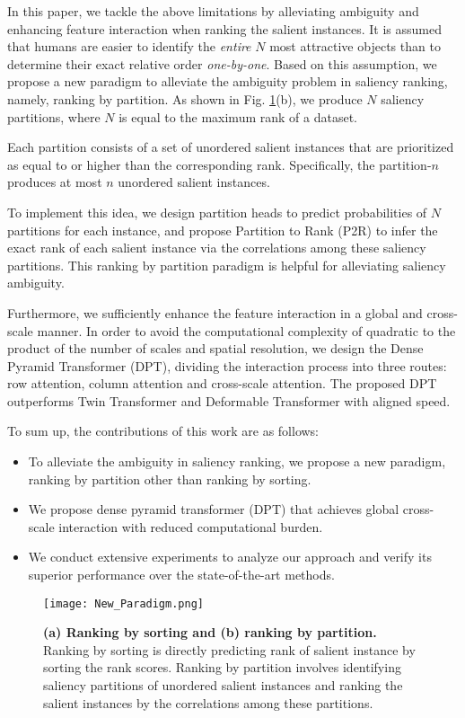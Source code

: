 \documentclass[sigconf]{acmart}
\begin{document}
In this paper, we tackle the above limitations by alleviating ambiguity and enhancing feature interaction when ranking the salient instances. It is assumed that humans are easier to identify the \textit{entire} $N$ most attractive objects than to determine their exact relative order \textit{one-by-one}. Based on this assumption, we propose a new paradigm to alleviate the ambiguity problem in saliency ranking, namely, ranking by partition. As shown in Fig. \ref{fig:Paradigm}(b), we produce $N$ saliency partitions, where $N$ is equal to the maximum rank of a dataset.

Each partition consists of a set of unordered salient instances that are prioritized as equal to or higher than the corresponding rank. Specifically, the partition-$n$ produces at most $n$ unordered salient instances.
 
To implement this idea, we design partition heads to predict probabilities of $N$ partitions for each instance, and propose Partition to Rank (P2R) to infer the exact rank of each salient instance via the correlations among these saliency partitions. This ranking by partition paradigm is helpful for alleviating saliency ambiguity.

Furthermore, we sufficiently enhance the feature interaction in a global and cross-scale manner. In order to avoid the computational complexity of quadratic to the product of the number of scales and spatial resolution, we design the Dense Pyramid Transformer (DPT), dividing the interaction process into three routes: row attention, column attention and cross-scale attention. 
The proposed DPT outperforms Twin Transformer \cite{guo2021sotr} and Deformable Transformer \cite{zhu2020deformable} with aligned speed.

To sum up, the contributions of this work are as follows: 
\begin{itemize}
    \item To alleviate the ambiguity in saliency ranking, we propose a new paradigm, ranking by partition other than ranking by sorting.
    \item We propose dense pyramid transformer (DPT) that achieves global cross-scale interaction with reduced  computational burden.
    \item We conduct extensive experiments to analyze our approach and verify its superior performance over the state-of-the-art methods.
\end{itemize}

\begin{figure}
	\begin{center}
		\texttt{[image: New\_Paradigm.png]}
		\caption{\textbf{(a) Ranking by sorting and (b) ranking by partition.} Ranking by sorting is directly predicting rank of salient instance by sorting the rank scores. Ranking by partition involves identifying saliency partitions of unordered salient instances and ranking the salient instances by the correlations among these partitions.
		}\label{fig:Paradigm}
	\end{center}
\end{figure}
\end{document}
